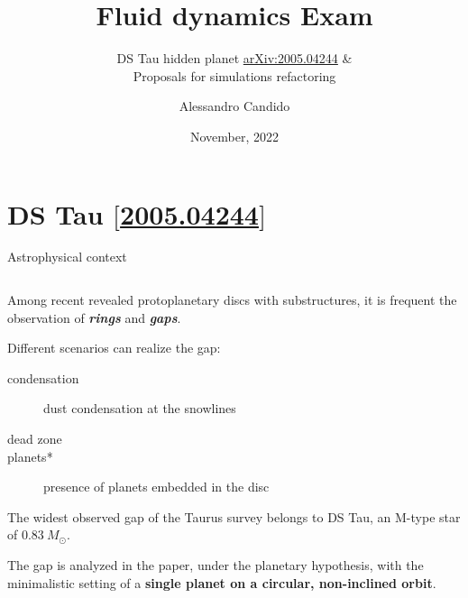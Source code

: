 \documentclass[9pt]{beamer}
\title{Fluid dynamics Exam}
\subtitle{
    DS Tau hidden planet \href{https://arxiv.org/abs/2005.04244}{arXiv:2005.04244} \cite{2020MNRAS.495.1913V} \&\\
   Proposals for simulations refactoring
}
\date{November, 2022}
\author{Alessandro Candido}
\providecommand{\iRef}[1]{{\color{mLightGreen}\small $[$#1$]$}}
\begin{document}
\maketitle


\section{DS Tau \iRef{\href{https://arxiv.org/abs/2005.04244}{2005.04244}}}

\begin{frame}{Astrophysical context}
    \begin{columns}
        \begin{column}{0.5\textwidth}
            \vspace*{15pt}

            Among recent revealed protoplanetary discs with substructures, it
            is frequent the observation of \textit{\textbf{rings}} and
            \textit{\textbf{gaps}}.
            \vspace*{10pt}

            Different scenarios can realize the gap:
            \begin{description}
                \item[condensation] dust condensation at the snowlines
                \item[dead zone]
                \item[planets*] presence of planets embedded in the disc
            \end{description}
            \vspace*{10pt}

            The widest observed gap of the Taurus survey belongs to DS Tau, an
            M-type star of $0.83~M_\odot$.

            The gap is analyzed in the paper, under the planetary hypothesis,
            with the minimalistic setting of a \textbf{single planet on a
            circular, non-inclined orbit}.
            \vspace*{10pt}


\end{column}
\end{columns}
\end{frame}
\end{document}
